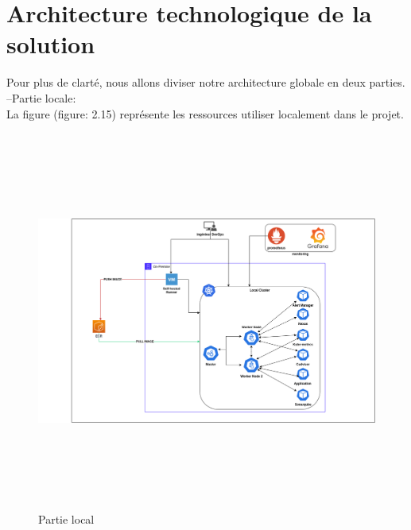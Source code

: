 \section{\selectfont\Large Architecture technologique de la solution}

 Pour plus de clarté, nous allons diviser notre architecture globale en deux parties.\\
\indent--Partie locale: \\[0.02cm]
La figure (figure: 2.15) représente les ressources utiliser localement dans le projet.


\begin{figure}[H]
\centering
\includegraphics[width=15cm,height=12.5cm]{LOCAL.drawio.png}

  \caption{Partie local}
\end{figure}

